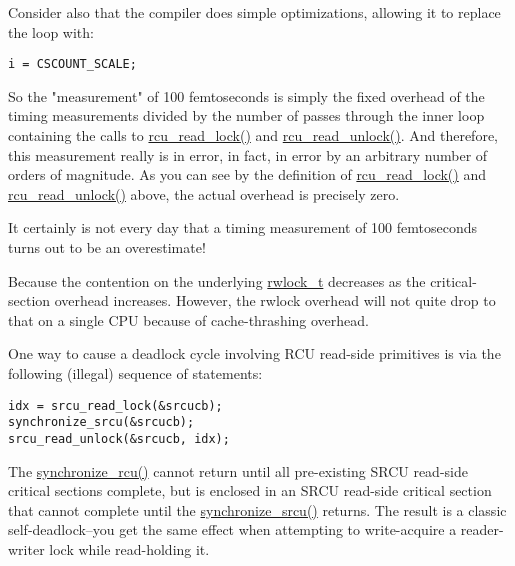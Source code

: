Consider also that the compiler does simple optimizations,
allowing it to replace the loop with:

\vspace{5pt}
\begin{minipage}[t]{\columnwidth}
\small
\begin{verbatim}
i = CSCOUNT_SCALE;
\end{verbatim}
\end{minipage}
\vspace{5pt}

So the "measurement" of 100 femtoseconds is simply the fixed
overhead of the timing measurements divided by the number of
passes through the inner loop containing the calls
to \url{rcu_read_lock()} and \url{rcu_read_unlock()}.
And therefore, this measurement really is in error, in fact,
in error by an arbitrary number of orders of magnitude.
As you can see by the definition of \url{rcu_read_lock()}
and \url{rcu_read_unlock()} above, the actual overhead
is precisely zero.

It certainly is not every day that a timing measurement of
100 femtoseconds turns out to be an overestimate!


Because the contention on the underlying
\url{rwlock_t} decreases as the critical-section overhead
increases.
However, the rwlock overhead will not quite drop to that on a single
CPU because of cache-thrashing overhead.


One way to cause a deadlock cycle involving
RCU read-side primitives is via the following (illegal) sequence
of statements:

\vspace{5pt}
\begin{minipage}[t]{\columnwidth}
\small
\begin{verbatim}
idx = srcu_read_lock(&srcucb);
synchronize_srcu(&srcucb);
srcu_read_unlock(&srcucb, idx);
\end{verbatim}
\end{minipage}
\vspace{5pt}

The \url{synchronize_rcu()} cannot return until all
pre-existing SRCU read-side critical sections complete, but
is enclosed in an SRCU read-side critical section that cannot
complete until the \url{synchronize_srcu()} returns.
The result is a classic self-deadlock--you get the same
effect when attempting to write-acquire a reader-writer lock
while read-holding it.

